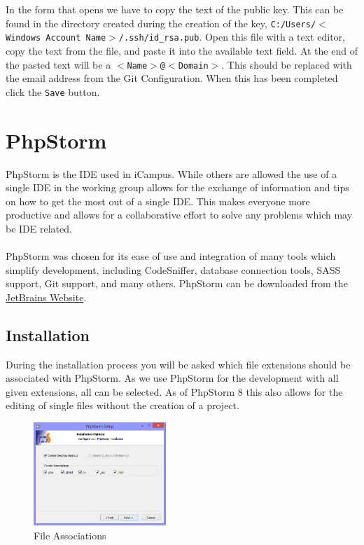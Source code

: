 \documentclass[]{report}
\begin{document}
\noindent
In the form that opens we have to copy the text of the public key. This can be found in the directory created during the creation of the key, \texttt{C:/Users/$<$Windows Account Name$>$/.ssh/id\_rsa.pub}. Open this file with a text editor, copy the text from the file, and paste it into the available text field. At the end of the pasted text will be a \texttt{$<$Name$>$@$<$Domain$>$}. This should be replaced with the email address from the Git Configuration. When this has been completed click the \texttt{Save} button.

\newpage

\section{PhpStorm}
\label{sec:PHP-Storm}

PhpStorm is the IDE used in iCampus. While others are allowed the use of a single IDE in the working group allows for the exchange of information and tips on how to get the most out of a single IDE. This makes everyone more productive and allows for a collaborative effort to solve any problems which may be IDE related.\\
\\
PhpStorm was chosen for its ease of use and integration of many tools which simplify development, including CodeSniffer, database connection tools, SASS support, Git support, and many others. PhpStorm can be downloaded from the \href{http://www.jetbrains.com/phpstorm/}{JetBrains Website}.

\subsection{Installation}
During the installation process you will be asked which file extensions should be associated with PhpStorm. As we use PhpStorm for the development with all given extensions, all can be selected. As of PhpStorm 8 this also allows for the editing of single files without the creation of a project.\\

\begin{figure}[h] 
  \centering
     \includegraphics[width=5cm]{fileassociations.png}
  \caption{File Associations}
\end{figure}
\end{document}
